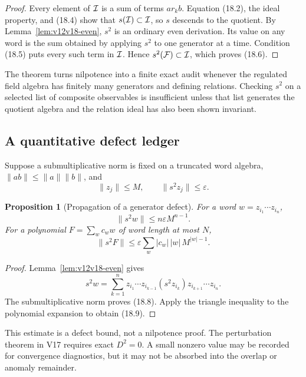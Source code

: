 \documentclass[11pt]{article}
\newtheorem{proposition}[theorem]{Proposition}
\theoremstyle{remark}
\begin{document}
\begin{proof}
Every element of \({\cal I}\) is a sum of terms \(a r_k b\).
Equation (18.2), the ideal property, and (18.4) show that
\(s({\cal I})\subset{\cal I}\), so \(s\) descends to the quotient.
By Lemma~\ref{lem:v12v18-even}, \(s^2\) is an ordinary even
derivation.  Its value on any word is the sum obtained by applying
\(s^2\) to one generator at a time.  Condition (18.5) puts every
such term in \({\cal I}\).  Hence \(s^2({\cal F})\subset{\cal I}\),
which proves (18.6).
\end{proof}

The theorem turns nilpotence into a finite exact audit whenever the
regulated field algebra has finitely many generators and defining
relations.  Checking \(s^2\) on a selected list of composite
observables is insufficient unless that list generates the quotient
algebra and the relation ideal has also been shown invariant.

\subsection{A quantitative defect ledger}

Suppose a submultiplicative norm is fixed on a truncated word algebra,
\(\|ab\|\le\|a\|\|b\|\), and
\[
 \|z_j\|\le M,\qquad \|s^2z_j\|\le\varepsilon.              \tag{18.7}
\]

\begin{proposition}[Propagation of a generator defect]
\label{prop:v12v18-defect}
For a word \(w=z_{i_1}\cdots z_{i_n}\),
\[
                         \|s^2w\|
 \le n\varepsilon M^{n-1}.                                 \tag{18.8}
\]
For a polynomial \(F=\sum_w c_w w\) of word length at most \(N\),
\[
 \|s^2F\|
 \le\varepsilon
 \sum_w |c_w|\,|w|\,M^{|w|-1}.                             \tag{18.9}
\]
\end{proposition}

\begin{proof}
Lemma~\ref{lem:v12v18-even} gives
\[
 s^2w
 =
 \sum_{k=1}^n
 z_{i_1}\cdots z_{i_{k-1}}
 (s^2z_{i_k})
 z_{i_{k+1}}\cdots z_{i_n}.                                \tag{18.10}
\]
The submultiplicative norm proves (18.8).  Apply the triangle
inequality to the polynomial expansion to obtain (18.9).
\end{proof}

This estimate is a defect bound, not a nilpotence proof.
The perturbation theorem in V17 requires exact \(D^2=0\).
A small nonzero value may be recorded for convergence diagnostics,
but it may not be absorbed into the overlap or anomaly remainder.
\end{document}
